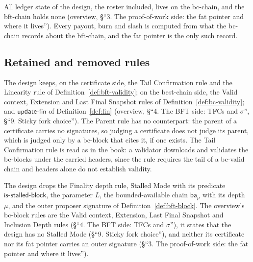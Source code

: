 \documentclass[11pt,a4paper]{article}
\theoremstyle{definition}
\newcommand{\isstalledblock}{\mathsf{is\text{-}stalled\text{-}block}}
\newcommand{\ba}{\mathsf{ba}}
\newcommand{\updatefin}{\mathsf{update\text{-}fin}}
\begin{document}
All ledger state of the design, the roster included, lives on the
bc-chain, and the bft-chain holds none (overview, \S``3. The proof-of-work
side: the fat pointer and where it lives''). Every payout, burn and slash is
computed from what the bc-chain records about the bft-chain, and the fat
pointer is the only such record.

\subsection{Retained and removed rules}\label{sec:sl-rules}

The design keeps, on the certificate side, the Tail Confirmation rule and
the Linearity rule of Definition~\ref{def:bft-validity}; on the best-chain
side, the Valid context, Extension and Last Final Snapshot rules of
Definition~\ref{def:bc-validity}; and $\updatefin$ of Definition~\ref{def:fin}
(overview, \S``4. The BFT side: TFCs and $\sigma$'', \S``9. Sticky fork
choice''). The Parent rule has no counterpart: the parent
of a certificate carries no signatures, so judging a certificate does not
judge its parent, which is judged only by a bc-block that cites it, if one
exists. The Tail
Confirmation rule is read as in the book: a validator downloads and validates
the bc-blocks under the carried headers, since the rule requires the tail of a
bc-valid chain and headers alone do not establish validity.

The design drops the Finality depth rule, Stalled Mode with its predicate
$\isstalledblock$, the parameter $L$, the bounded-available chain $\ba_\mu$
with its depth $\mu$, and the outer proposer signature of
Definition~\ref{def:bft-block}. The overview's bc-block rules are the Valid
context, Extension, Last Final Snapshot and Inclusion Depth rules
(\S``4. The BFT side: TFCs and $\sigma$''), it states that the design has no
Stalled Mode (\S``9. Sticky fork choice''), and neither its certificate nor its
fat pointer carries an outer signature (\S``3. The proof-of-work side: the fat
pointer and where it lives'').
\end{document}
